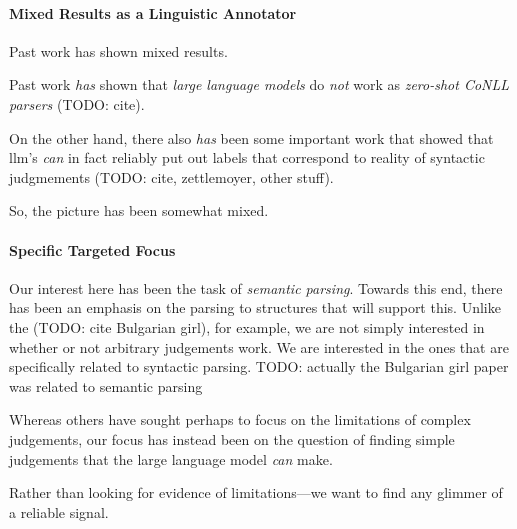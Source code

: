 \label{sec:discussion}

\paragraph{Mixed Results as a Linguistic Annotator}
Past work has shown mixed results.

Past work {\em has} shown that {\em large language models} do {\em not} work as {\em zero-shot CoNLL parsers} (TODO: cite).

On the other hand, there also {\em has} been some important work that showed that llm's {\em can} in fact reliably put out labels that correspond to reality of syntactic judgmements (TODO: cite, zettlemoyer, other stuff).

So, the picture has been somewhat mixed.


\paragraph{Specific Targeted Focus}

Our interest here has been the task of {\em semantic parsing}.
Towards this end, there has been an emphasis on the parsing to structures that will support this.
Unlike the (TODO: cite Bulgarian girl), for example, we are not simply interested in whether or not arbitrary judgements work.
We are interested in the ones that are specifically related to syntactic parsing.
TODO: actually the Bulgarian girl paper was related to semantic parsing

Whereas others have sought perhaps to focus on the limitations of complex judgements, our focus has instead been on the question of finding simple judgements that the large language model {\em can} make.

Rather than looking for evidence of limitations---we want to find any glimmer of a reliable signal.

